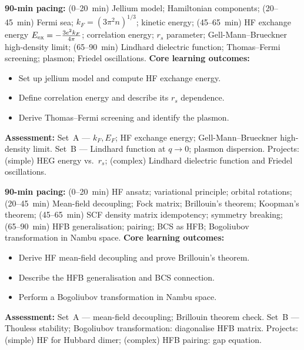 \documentclass[11pt,a4paper]{article}
\begin{document}
\medskip

\begin{tcolorbox}[modulebox, title={Module~II.4 / L03: The Homogeneous Electron Gas}]
\textbf{90-min pacing:} (0--20~min) Jellium model; Hamiltonian components; (20--45~min) Fermi sea; $k_F=(3\pi^2n)^{1/3}$; kinetic energy; (45--65~min) HF exchange energy $E_{\rm ex}=-\tfrac{3e^2k_F}{4\pi}$; correlation energy; $r_s$ parameter; Gell-Mann--Brueckner high-density limit; (65--90~min) Lindhard dielectric function; Thomas--Fermi screening; plasmon; Friedel oscillations.
\medskip\textbf{Core learning outcomes:}
\begin{itemize}[leftmargin=1.4em,topsep=2pt,itemsep=1pt]
  \item Set up jellium model and compute HF exchange energy.
  \item Define correlation energy and describe its $r_s$ dependence.
  \item Derive Thomas--Fermi screening and identify the plasmon.
\end{itemize}
\medskip\textbf{Assessment:}
Set~A --- $k_F,E_F$; HF exchange energy; Gell-Mann--Brueckner high-density limit.
Set~B --- Lindhard function at $q\to0$; plasmon dispersion.
Projects: (simple) HEG energy vs.\ $r_s$; (complex) Lindhard dielectric function and Friedel oscillations.
\end{tcolorbox}

\medskip

\begin{tcolorbox}[modulebox, title={Module~II.4 / L04: Hartree--Fock in Second Quantisation}]
\textbf{90-min pacing:} (0--20~min) HF ansatz; variational principle; orbital rotations; (20--45~min) Mean-field decoupling; Fock matrix; Brillouin's theorem; Koopman's theorem; (45--65~min) SCF density matrix idempotency; symmetry breaking; (65--90~min) HFB generalisation; pairing; BCS as HFB; Bogoliubov transformation in Nambu space.
\medskip\textbf{Core learning outcomes:}
\begin{itemize}[leftmargin=1.4em,topsep=2pt,itemsep=1pt]
  \item Derive HF mean-field decoupling and prove Brillouin's theorem.
  \item Describe the HFB generalisation and BCS connection.
  \item Perform a Bogoliubov transformation in Nambu space.
\end{itemize}
\medskip\textbf{Assessment:}
Set~A --- mean-field decoupling; Brillouin theorem check.
Set~B --- Thouless stability; Bogoliubov transformation: diagonalise HFB matrix.
Projects: (simple) HF for Hubbard dimer; (complex) HFB pairing: gap equation.
\end{tcolorbox}
\end{document}
